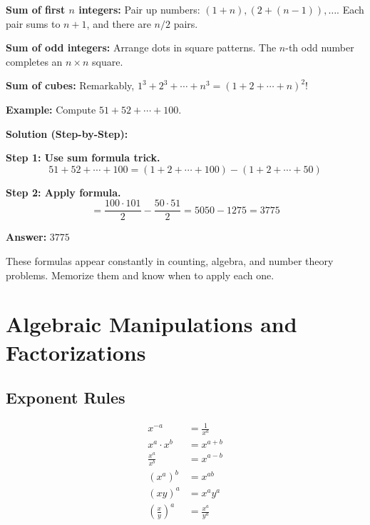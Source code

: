 \documentclass[12pt]{extarticle}
\begin{document}
\begin{conceptbox}
\textbf{Sum of first $n$ integers:} Pair up numbers: $(1+n), (2+(n-1)), \ldots$. Each pair sums to $n+1$, and there are $n/2$ pairs.

\textbf{Sum of odd integers:} Arrange dots in square patterns. The $n$-th odd number completes an $n \times n$ square.

\textbf{Sum of cubes:} Remarkably, $1^3+2^3+\cdots+n^3 = (1+2+\cdots+n)^2$!
\end{conceptbox}

\begin{examplebox}
\textbf{Example:} Compute $51 + 52 + \cdots + 100$.

\textbf{Solution (Step-by-Step):}

\textbf{Step 1: Use sum formula trick.}
\[
51 + 52 + \cdots + 100 = (1+2+\cdots+100) - (1+2+\cdots+50)
\]

\textbf{Step 2: Apply formula.}
\[
= \frac{100 \cdot 101}{2} - \frac{50 \cdot 51}{2} = 5050 - 1275 = 3775
\]

\textbf{Answer:} $\boxed{3775}$
\end{examplebox}

\begin{remarkbox}
These formulas appear constantly in counting, algebra, and number theory problems. Memorize them and know when to apply each one.
\end{remarkbox}

\section{Algebraic Manipulations and Factorizations}

\subsection*{Exponent Rules}

\begin{conceptbox}
\begin{align*}
x^{-a} &= \frac{1}{x^a} \\
x^a \cdot x^b &= x^{a+b} \\
\frac{x^a}{x^b} &= x^{a-b} \\
(x^a)^b &= x^{ab} \\
(xy)^a &= x^a y^a \\
\left(\frac{x}{y}\right)^a &= \frac{x^a}{y^a}
\end{align*}
\end{conceptbox}
\end{document}
